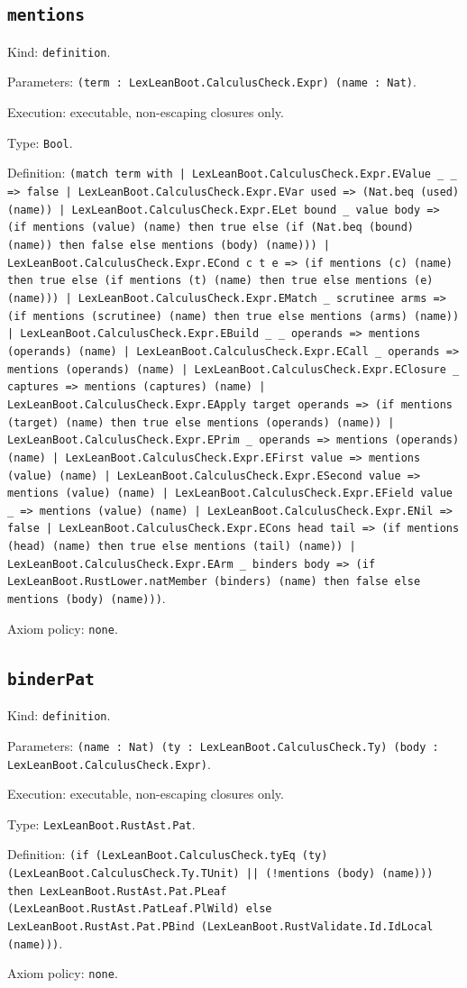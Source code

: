 \documentclass[11pt]{article}
\begin{document}
\subsection*{\texttt{mentions}}
\noindent Kind: \texttt{definition}.\par
\noindent Parameters: \texttt{(term : LexLeanBoot.CalculusCheck.Expr) (name : Nat)}.\par
\noindent Execution: executable, non-escaping closures only.\par
\noindent Type: \texttt{Bool}.\par
\noindent Definition: \texttt{(match term with | LexLeanBoot.CalculusCheck.Expr.EValue \_ \_ => false | LexLeanBoot.CalculusCheck.Expr.EVar used => (Nat.beq (used) (name)) | LexLeanBoot.CalculusCheck.Expr.ELet bound \_ value body => (if mentions (value) (name) then true else (if (Nat.beq (bound) (name)) then false else mentions (body) (name))) | LexLeanBoot.CalculusCheck.Expr.ECond c t e => (if mentions (c) (name) then true else (if mentions (t) (name) then true else mentions (e) (name))) | LexLeanBoot.CalculusCheck.Expr.EMatch \_ scrutinee arms => (if mentions (scrutinee) (name) then true else mentions (arms) (name)) | LexLeanBoot.CalculusCheck.Expr.EBuild \_ \_ operands => mentions (operands) (name) | LexLeanBoot.CalculusCheck.Expr.ECall \_ operands => mentions (operands) (name) | LexLeanBoot.CalculusCheck.Expr.EClosure \_ captures => mentions (captures) (name) | LexLeanBoot.CalculusCheck.Expr.EApply target operands => (if mentions (target) (name) then true else mentions (operands) (name)) | LexLeanBoot.CalculusCheck.Expr.EPrim \_ operands => mentions (operands) (name) | LexLeanBoot.CalculusCheck.Expr.EFirst value => mentions (value) (name) | LexLeanBoot.CalculusCheck.Expr.ESecond value => mentions (value) (name) | LexLeanBoot.CalculusCheck.Expr.EField value \_ => mentions (value) (name) | LexLeanBoot.CalculusCheck.Expr.ENil => false | LexLeanBoot.CalculusCheck.Expr.ECons head tail => (if mentions (head) (name) then true else mentions (tail) (name)) | LexLeanBoot.CalculusCheck.Expr.EArm \_ binders body => (if LexLeanBoot.RustLower.natMember (binders) (name) then false else mentions (body) (name)))}.\par
\noindent Axiom policy: \texttt{none}.\par
\subsection*{\texttt{binderPat}}
\noindent Kind: \texttt{definition}.\par
\noindent Parameters: \texttt{(name : Nat) (ty : LexLeanBoot.CalculusCheck.Ty) (body : LexLeanBoot.CalculusCheck.Expr)}.\par
\noindent Execution: executable, non-escaping closures only.\par
\noindent Type: \texttt{LexLeanBoot.RustAst.Pat}.\par
\noindent Definition: \texttt{(if (LexLeanBoot.CalculusCheck.tyEq (ty) (LexLeanBoot.CalculusCheck.Ty.TUnit) || (!mentions (body) (name))) then LexLeanBoot.RustAst.Pat.PLeaf (LexLeanBoot.RustAst.PatLeaf.PlWild) else LexLeanBoot.RustAst.Pat.PBind (LexLeanBoot.RustValidate.Id.IdLocal (name)))}.\par
\noindent Axiom policy: \texttt{none}.\par
\end{document}
